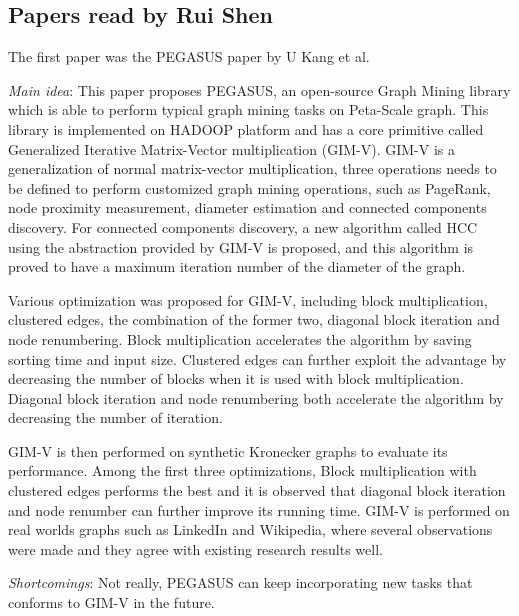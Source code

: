 \subsection{Papers read by Rui Shen}

The first paper was the PEGASUS paper by U Kang et al.
\cite{Kang09}
\begin{itemize*}
\item {\em Main idea}: 
This paper proposes PEGASUS, an open-source Graph Mining library which is able to perform typical graph mining tasks on Peta-Scale graph. This library is implemented on HADOOP platform and has a core primitive called Generalized Iterative Matrix-Vector multiplication (GIM-V). GIM-V is a generalization of normal matrix-vector multiplication, three operations needs to be defined to perform customized graph mining operations, such as PageRank, node proximity measurement, diameter estimation and connected components discovery. For connected components discovery, a new algorithm called HCC using the abstraction provided by GIM-V is proposed, and this algorithm is proved to have a maximum iteration number of the diameter of the graph.

Various optimization was proposed for GIM-V, including block multiplication, clustered edges, the combination of the former two, diagonal block iteration and node renumbering. Block multiplication accelerates the algorithm by saving sorting time and input size. Clustered edges can further exploit the advantage by decreasing the number of blocks when it is used with block multiplication. Diagonal block iteration and node renumbering both accelerate the algorithm by decreasing the number of iteration. 

GIM-V is then performed on synthetic Kronecker graphs to evaluate its performance. Among the first three optimizations, Block multiplication with clustered edges performs the best and it is observed that diagonal block iteration and node renumber can further improve its running time. GIM-V is performed on real worlds graphs such as LinkedIn and Wikipedia, where several observations were made and they agree with existing research results well.
\item {\em Shortcomings}:
Not really, PEGASUS can keep incorporating new tasks that conforms to GIM-V in the future.
\end{itemize*}

